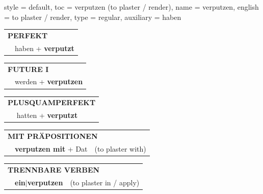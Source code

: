 \begin{verbentry}{
  style = {default},
  toc = {verputzen (to plaster / render)},
  name = {verputzen},
  english = {to plaster / render},
  type = {regular},
  auxiliary = {haben}
}
 \begin{tabular}{rl}
     \multicolumn{2}{l}{\textbf{PERFEKT}}\\
   & haben + \textbf{verputzt}\\
  \end{tabular}
\hfill
\begin{tabular}{rl}
    \multicolumn{2}{l}{\textbf{FUTURE I}}\\
   & werden + \textbf{verputzen}\\
  \end{tabular}
\hfill
\begin{tabular}{rl}
    \multicolumn{2}{l}{\textbf{PLUSQUAMPERFEKT}}\\
   & hatten + \textbf{verputzt}\\
  \end{tabular}

 \vspace{10pt}

\begin{tabular}{lll}
      \multicolumn{3}{l}{\textbf{MIT PRÄPOSITIONEN}}\\
& \textbf{verputzen mit} + Dat & (to plaster with)\\
\end{tabular}
  \hfill
\begin{tabular}{lll}
      \multicolumn{3}{l}{\textbf{TRENNBARE VERBEN}}\\
 & \textbf{ein$|$verputzen} & (to plaster in / apply)\\
  \end{tabular}


\vspace{-5pt}
\end{verbentry}

